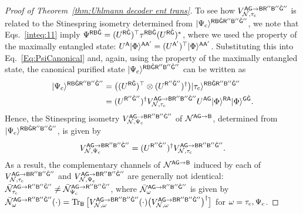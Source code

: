 \begin{proof}[Proof of Theorem~\ref{thm:Uhlmann decoder ent trans}]
To see how $V_{\cN, \tau_{\rm c}}^{\sA\sG\rarr\sB\sR''\sB''\hat{\sG}''}$ is related to the Stinespring isometry determined from $\ket{\Psi_{\rm c}}^{\sR\sB\hat{\sG}\sR''\sB''\hat{\sG}''}$, we note that Eqs.~\eqref{inteq:11} imply $\Psi^{\sR\sB\hat{\sG}} = (U^{\sR\hat{\sG}})^\top\tau^{\sR\sB\hat{\sG}}(U^{\sR\hat{\sG}})^*$, where we used the property of the maximally entangled state: $U^\sA\ket{\Phi}^{\sA\sA'} = (U^{\sA'})^\top\ket{\Phi}^{\sA\sA'}$.
Substituting this into Eq.~\eqref{Eq:PsiCanonical} and, again, using the property of the maximally entangled state, the canonical purified state $\ket{\Psi_{\rm c}}^{\sR\sB\hat{\sG}\sR''\sB''\hat{\sG}''}$ can be written as
\begin{align}
    \ket{\Psi_{\rm c}}^{\sR\sB\hat{\sG}\sR''\sB''\hat{\sG}''}
    &= \big((U^{\sR\hat{\sG}})^\top\otimes(U^{\sR''\hat{\sG}''})^\dag\big)\ket{\tau_{\rm c}}^{\sR\sB\hat{\sG}\sR''\sB''\hat{\sG}''} \\
    \label{inteq:132}
    &=(U^{\sR''\hat{\sG}''})^\dag V_{\cN, \tau_{\rm c}}^{\sA\sG\rarr\sB\sR''\sB''\hat{\sG}''} U^{\sA\sG}\ket{\Phi}^{\sR\sA}\ket{\Phi}^{\sG\hat{\sG}}.
\end{align}
Hence, the Stinespring isometry $V_{\cN, \Psi_{\rm c}}^{\sA\sG\rarr\sB\sR''\sB''\hat{\sG}''}$ of $\cN^{\sA\sG\rarr\sB}$, determined from $\ket{\Psi_{\rm c}}^{\sR\sB\hat{\sG}\sR''\sB''\hat{\sG}''}$, is given by 
\begin{align}
\label{inteq:154}
    V_{\cN, \Psi_{\rm c}}^{\sA\sG\rarr\sB\sR''\sB''\hat{\sG}''} = (U^{\sR''\hat{\sG}''})^\dag V_{\cN, \tau_{\rm c}}^{\sA\sG\rarr\sB\sR''\sB''\hat{\sG}''}.
\end{align}
As a result, the complementary channels of $\cN^{\sA\sG\rarr\sB}$ induced by each of $V_{\cN, \tau_{\rm c}}^{\sA\sG\rarr\sB\sR''\sB''\hat{\sG}''}$ and $V_{\cN, \Psi_{\rm c}}^{\sA\sG\rarr\sB\sR''\sB''\hat{\sG}''}$ are generally not identical: $\bar{\cN}_{\tau_{\rm c}}^{\sA\sG\rarr\sR''\sB''\hat{\sG}''} \neq \bar{\cN}_{\Psi_{\rm c}}^{\sA\sG\rarr\sR''\sB''\hat{\sG}''}$, where $\bar{\cN}_\omega^{\sA\sG\rarr\sR''\sB''\hat{\sG}''}$ is given by $\bar{\cN}_\omega^{\sA\sG\rarr\sR''\sB''\hat{\sG}''}(\cdot) = \tr_\sB\big[V_{\cN, \omega}^{\sA\sG\rarr\sB\sR''\sB''\hat{\sG}''}(\cdot)\big(V_{\cN, \omega}^{\sA\sG\rarr\sB\sR''\sB''\hat{\sG}''}\big)^\dag\big]$
for $\omega = \tau_{\rm c}, \Psi_{\rm c}$.






\end{proof}
